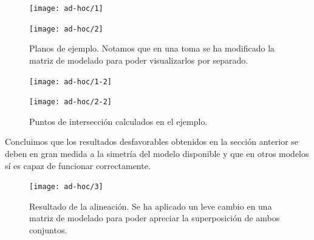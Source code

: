 \begin{figure}[h!]
	\begin{minipage}{0.5\textwidth}
		\centering
		\texttt{[image: ad-hoc/1]} 
	\end{minipage}
	\begin{minipage}{0.5\textwidth}
		\centering
		\texttt{[image: ad-hoc/2]} 
	\end{minipage}
	\caption{Planos de ejemplo. Notamos que en una toma se ha modificado la matriz de modelado\footnotemark \hspace{0.5mm}  para poder visualizarlos por separado.}
	\label{fig:ad-hoc}
\end{figure}
\begin{figure}[h!]
	\begin{minipage}{0.5\textwidth}
		\centering
		\texttt{[image: ad-hoc/1-2]} 
	\end{minipage}
	\begin{minipage}{0.5\textwidth}
		\centering
		\texttt{[image: ad-hoc/2-2]} 
	\end{minipage}
	\caption{Puntos de intersección calculados en el ejemplo.}
	\label{fig:ad-hoc2}
\end{figure}


Concluimos que los resultados desfavorables obtenidos en la sección anterior se deben en gran medida a la simetría del modelo disponible y que en otros modelos sí es capaz de funcionar correctamente.
\newpage
\begin{figure}[H]
	\centering
	\texttt{[image: ad-hoc/3]} 
	\caption{Resultado de la alineación. Se ha aplicado un leve cambio en una matriz de modelado para poder apreciar la superposición de ambos conjuntos.}
	\label{fig:ad-hoc3}
\end{figure}
